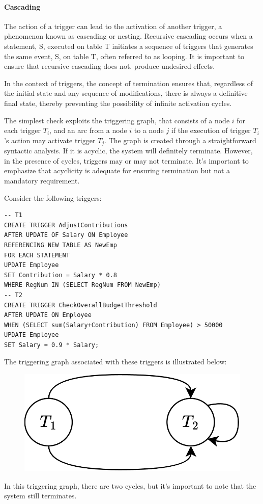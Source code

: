 \paragraph*{Cascading}
The action of a trigger can lead to the activation of another trigger, a phenomenon known as cascading or nesting.
Recursive cascading occurs when a statement, S, executed on table T initiates a sequence of triggers that generates the same event, S, on table T, often referred to as looping.
It is important to ensure that recursive cascading does not. produce undesired effects. 
\begin{definition}
    In the context of triggers, the concept of termination ensures that, regardless of the initial state and any sequence of modifications, there is always a definitive final state, thereby preventing the possibility of infinite activation cycles.
\end{definition}
The simplest check exploits the triggering graph, that consists of a node $i$ for each trigger $T_i$, and an arc from a node $i$ to a node $j$ if the execution of trigger $T_i$'s action may activate trigger $T_j$.
The graph is created through a straightforward syntactic analysis. 
If it is acyclic, the system will definitely terminate. 
However, in the presence of cycles, triggers may or may not terminate. 
It's important to emphasize that acyclicity is adequate for ensuring termination but not a mandatory requirement.
\begin{example}
    Consider the following triggers:
    \begin{lstlisting}[style=SQL]
-- T1
CREATE TRIGGER AdjustContributions
AFTER UPDATE OF Salary ON Employee
REFERENCING NEW TABLE AS NewEmp
FOR EACH STATEMENT
UPDATE Employee
SET Contribution = Salary * 0.8
WHERE RegNum IN (SELECT RegNum FROM NewEmp)
-- T2
CREATE TRIGGER CheckOverallBudgetThreshold
AFTER UPDATE ON Employee
WHEN (SELECT sum(Salary+Contribution) FROM Employee) > 50000
UPDATE Employee
SET Salary = 0.9 * Salary; 
    \end{lstlisting}
    The triggering graph associated with these triggers is illustrated below:
    \begin{figure}[H]
        \centering
        \includegraphics[width=0.25\linewidth]{images/trig.png}
    \end{figure}
    In this triggering graph, there are two cycles, but it's important to note that the system still terminates.
\end{example}